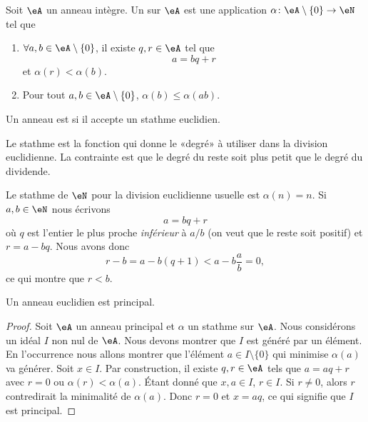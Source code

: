 \begin{definition}
    Soit \( \eA\) un anneau intègre. Un  sur \( \eA\) est une application \( \alpha\colon \eA\setminus\{ 0 \}\to \eN\) tel que
    \begin{enumerate}
        \item
            \( \forall a,b\in \eA\setminus\{ 0 \}\), il existe \( q,r\in \eA\) tel que
            \begin{equation}
                a=bq+r
            \end{equation}
            et \( \alpha(r)<\alpha(b)\).
        \item
            Pour tout \( a,b\in \eA\setminus\{ 0 \}\), \( \alpha(b)\leq \alpha(ab)\).
    \end{enumerate}
    Un anneau est  si il accepte un stathme euclidien.
\end{definition}
Le stathme est la fonction qui donne le «degré» à utiliser dans la division euclidienne. La contrainte est que le degré du reste soit plus petit que le degré du dividende.

\begin{example} \label{ExwqlCwvV}
    Le stathme de \( \eN\) pour la division euclidienne usuelle est \( \alpha(n)=n\). Si \( a,b\in \eN\) nous écrivons
    \begin{equation}
        a=bq+r
    \end{equation}
    où \( q\) est l'entier le plus proche \emph{inférieur} à \( a/b\) (on veut que le reste soit positif) et \( r=a-bq\). Nous avons donc
    \begin{equation}
        r-b=a-b(q+1)<a-b\frac{ a }{ b }=0,
    \end{equation}
    ce qui montre que \( r<b\).
\end{example}

\begin{proposition}\label{Propkllxnv}
    Un anneau euclidien est principal.
\end{proposition}

\begin{proof}
    Soit \( \eA\) un anneau principal et \( \alpha\) un stathme sur \( \eA\). Nous considérons un idéal \( I\) non nul de \( \eA\). Nous devons montrer que \( I\) est généré par un élément. En l'occurrence nous allons montrer que l'élément \( a\in I\setminus\{ 0 \}\) qui minimise \( \alpha(a)\) va générer. Soit \( x\in I\). Par construction, il existe \( q,r\in \eA\) tels que \( a=aq+r\) avec \( r=0\) ou \( \alpha(r)<\alpha(a)\). Étant donné que \( x,a\in I\), \( r\in I\). Si \( r\neq 0\), alors \( r\) contredirait la minimalité de \( \alpha(a)\). Donc \( r=0\) et \( x=aq\), ce qui signifie que \( I\) est principal.
\end{proof}


